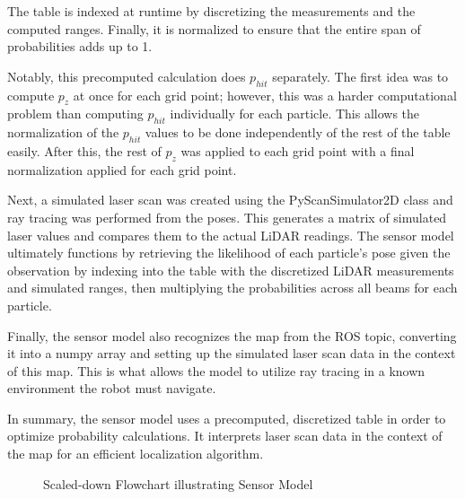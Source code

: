 \documentclass{article}
\begin{document}
The table is indexed at runtime by discretizing the measurements and the computed ranges. Finally, it is normalized to ensure that the entire span of probabilities adds up to 1. 

Notably, this precomputed calculation does $p_{hit}$ separately. The first idea was to compute $p_z$ at once for each grid point; however, this was a harder computational problem than computing $p_{hit}$ individually for each particle. This allows the normalization of the $p_{hit}$ values to be done independently of the rest of the table easily. After this, the rest of $p_z$ was applied to each grid point with a final normalization applied for each grid point.

Next, a simulated laser scan was created using the PyScanSimulator2D class and ray tracing was performed from the poses. This generates a matrix of simulated laser values and compares them to the actual LiDAR readings. The sensor model ultimately functions by retrieving the likelihood of each particle's pose given the observation by indexing into the table with the discretized LiDAR measurements and simulated ranges, then multiplying the probabilities across all beams for each particle. 

Finally, the sensor model also recognizes the map from the ROS topic, converting it into a numpy array and setting up the simulated laser scan data in the context of this map. This is what allows the model to utilize ray tracing in a known environment the robot must navigate. 

In summary, the sensor model uses a precomputed, discretized table in order to optimize probability calculations. It interprets laser scan data in the context of the map for an efficient localization algorithm. 


\vspace{1cm}
\begin{figure}[htbp]
  \centering
  \caption{Scaled-down Flowchart illustrating Sensor Model}
  \label{fig:scaled_flowchart_sensor_model}
\end{figure}
\end{document}
